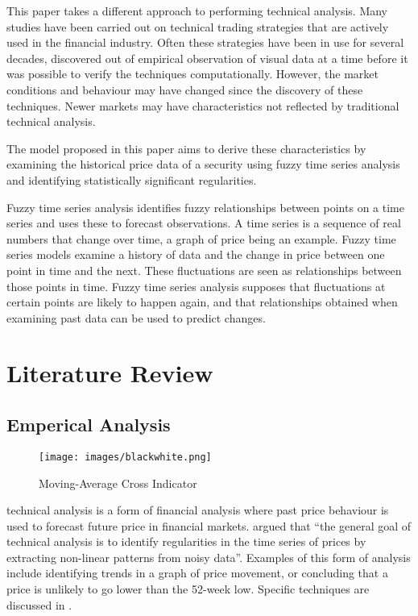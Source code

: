 \documentclass{article}
\theoremstyle{definition}
\begin{document}
This paper takes a different approach to performing technical analysis. Many studies have been carried out on technical trading strategies that are actively used in the financial industry. Often these strategies have been in use for several decades, discovered out of empirical observation of visual data at a time before it was possible to verify the techniques computationally. However, the market conditions and behaviour may have changed since the discovery of these techniques. Newer markets may have characteristics not reflected by traditional technical analysis. 

The model proposed in this paper aims to derive these characteristics by examining the historical price data of a security using fuzzy time series analysis and identifying statistically significant regularities. 

Fuzzy time series analysis identifies fuzzy relationships between points on a time series and uses these to forecast observations. A time series is a sequence of real numbers that change over time, a graph of price being an example. Fuzzy time series models examine a history of data and the change in price between one point in time and the next. These fluctuations are seen as relationships between those points in time. Fuzzy time series analysis supposes that fluctuations at certain points are likely to happen again, and that relationships obtained when examining past data can be used to predict changes.

\section{Literature Review}

\subsection{Emperical Analysis}

\begin{figure}[H]
    \centering
    \texttt{[image: images/blackwhite.png]}
    \caption{Moving-Average Cross Indicator}
\end{figure}

technical analysis is a form of financial analysis where past price behaviour is used to forecast future price in financial markets. \cite{foundations} argued that ``the general goal of technical analysis is to identify regularities in the time series of prices by extracting non-linear patterns from noisy data''. Examples of this form of analysis include identifying trends in a graph of price movement, or concluding that a price is unlikely to go lower than the 52-week low. Specific techniques are discussed in .
\end{document}
